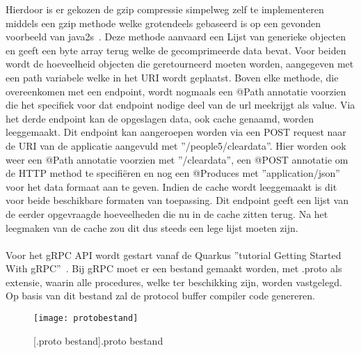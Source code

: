 Hierdoor is er gekozen de gzip compressie simpelweg zelf te implementeren middels een gzip methode welke grotendeels gebaseerd is op een gevonden voorbeeld van java2s~\parencite{gzipCompressie}.
Deze methode aanvaard een Lijst van generieke objecten en geeft een byte array terug welke de gecomprimeerde data bevat.
Voor beiden wordt de hoeveelheid objecten die geretourneerd moeten worden, aangegeven met een path variabele welke in het URI wordt geplaatst.
Boven elke methode, die overeenkomen met een endpoint, wordt nogmaals een @Path annotatie voorzien die het specifiek voor dat endpoint nodige deel van de url meekrijgt als value.
Via het derde endpoint kan de opgeslagen data, ook cache genaamd, worden leeggemaakt. Dit endpoint kan aangeroepen worden via een POST request naar
de URI van de applicatie aangevuld met ''/people5/cleardata''. Hier worden ook weer een @Path annotatie voorzien met ''/cleardata'', een @POST annotatie om de HTTP method te
specifi\"eren en nog een @Produces met ''application/json'' voor het data formaat aan te geven. Indien de cache wordt leeggemaakt is dit voor beide beschikbare formaten van toepassing.
Dit endpoint geeft een lijst van de eerder opgevraagde hoeveelheden die nu in de cache zitten terug.
Na het leegmaken van de cache zou dit dus steeds een lege lijst moeten zijn.\newline
~\autocite{quarkusREST}\\
~\autocite{Jakarta}\\

Voor het gRPC API wordt gestart vanaf de Quarkus ''tutorial Getting Started With gRPC''~\parencite{quarkusgRPC}.
Bij gRPC moet er een bestand gemaakt worden, met .proto als extensie, waarin alle procedures, welke ter beschikking zijn, worden vastgelegd.
Op basis van dit bestand zal de protocol buffer compiler code genereren.

\begin{figure}[ht]
    \centering
    \texttt{[image: protobestand]}
    \caption{[.proto bestand].proto bestand}
\end{figure}

